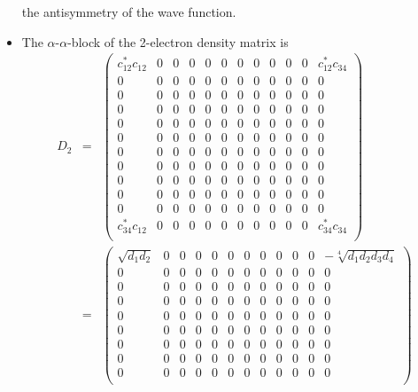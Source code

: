 \documentclass{amsart}
\begin{document}
\begin{itemize}
         the antisymmetry of the wave function.
\item The $\alpha$-$\alpha$-block of the 2-electron density matrix is
         \begin{eqnarray}
         D_2 &=&
         \begin{pmatrix}
         c_{12}^*c_{12} & 0 & 0 & 0 & 0 & 0 & 0 & 0 & 0 & 0 & 0 & c_{12}^*c_{34} \\
         0 & 0 & 0 & 0 & 0 & 0 & 0 & 0 & 0 & 0 & 0 & 0 \\
         0 & 0 & 0 & 0 & 0 & 0 & 0 & 0 & 0 & 0 & 0 & 0 \\
         0 & 0 & 0 & 0 & 0 & 0 & 0 & 0 & 0 & 0 & 0 & 0 \\
         0 & 0 & 0 & 0 & 0 & 0 & 0 & 0 & 0 & 0 & 0 & 0 \\
         0 & 0 & 0 & 0 & 0 & 0 & 0 & 0 & 0 & 0 & 0 & 0 \\
         0 & 0 & 0 & 0 & 0 & 0 & 0 & 0 & 0 & 0 & 0 & 0 \\
         0 & 0 & 0 & 0 & 0 & 0 & 0 & 0 & 0 & 0 & 0 & 0 \\
         0 & 0 & 0 & 0 & 0 & 0 & 0 & 0 & 0 & 0 & 0 & 0  \\
         0 & 0 & 0 & 0 & 0 & 0 & 0 & 0 & 0 & 0 & 0 & 0  \\
         0 & 0 & 0 & 0 & 0 & 0 & 0 & 0 & 0 & 0 & 0 & 0  \\
         c_{34}^*c_{12} & 0 & 0 & 0 & 0 & 0 & 0 & 0 & 0 & 0 & 0 &  c_{34}^*c_{34} \\
         \end{pmatrix} \\
         \label{Eq:D2aa-wfn}
         &=&
         \begin{pmatrix}
         \sqrt{d_{1}d_{2}} & 0 & 0 & 0 & 0 & 0 & 0 & 0 & 0 & 0 & 0 & -\sqrt[4]{d_{1}d_{2}d_{3}d_{4}} \\
         0 & 0 & 0 & 0 & 0 & 0 & 0 & 0 & 0 & 0 & 0 & 0 \\
         0 & 0 & 0 & 0 & 0 & 0 & 0 & 0 & 0 & 0 & 0 & 0 \\
         0 & 0 & 0 & 0 & 0 & 0 & 0 & 0 & 0 & 0 & 0 & 0 \\
         0 & 0 & 0 & 0 & 0 & 0 & 0 & 0 & 0 & 0 & 0 & 0 \\
         0 & 0 & 0 & 0 & 0 & 0 & 0 & 0 & 0 & 0 & 0 & 0 \\
         0 & 0 & 0 & 0 & 0 & 0 & 0 & 0 & 0 & 0 & 0 & 0 \\
         0 & 0 & 0 & 0 & 0 & 0 & 0 & 0 & 0 & 0 & 0 & 0 \\
         0 & 0 & 0 & 0 & 0 & 0 & 0 & 0 & 0 & 0 & 0 & 0 \\

\end{pmatrix}
\end{eqnarray}
\end{itemize}
\end{document}
